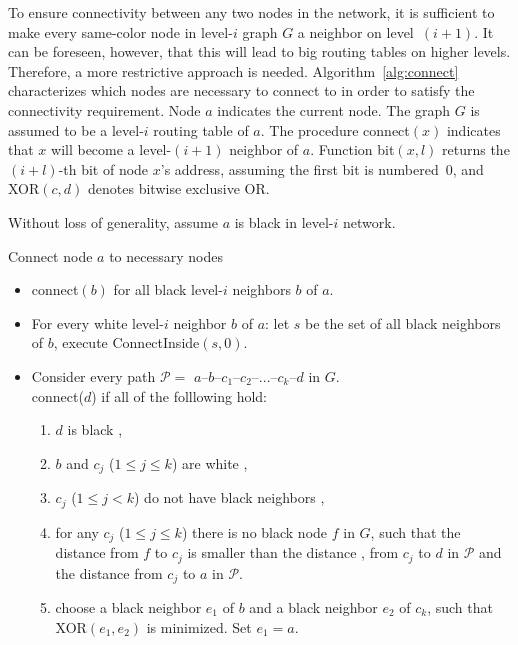 \documentclass[conference]{IEEEtran}
\theoremstyle{definition}
\newcommand{\cP}{{\mathcal{P}}}
\newcommand{\cN}{{\mathcal{N}}}
\begin{document}
To ensure connectivity between any two nodes in the network, it is sufficient to make every same-color node in level-$i$ graph $G$ a neighbor on level~$(i+1)$. It can be foreseen, however, that this will lead to big routing tables on higher levels. Therefore, a more restrictive approach is needed. Algorithm~\ref{alg:connect} characterizes which nodes are necessary to connect to in order to satisfy the connectivity requirement. Node $a$ indicates the current node. The graph $G$ is assumed to be a level-$i$ routing table of $a$.
The procedure  connect$(x)$ indicates that $x$ will become a level-$(i+1)$ neighbor of $a$. Function bit$(x, l)$ returns the $(i + l)$-th bit of node $x$'s address, assuming the first bit is numbered~0, and XOR$(c, d)$ denotes bitwise exclusive OR.

Without loss of generality, assume $a$ is black in level-$i$ network.



\begin{algorithm}[H]
    \caption{Connect node $a$ to necessary nodes}
    \label{alg:connect}

    \begin{itemize} 
        \item   connect$(b)$ for all black level-$i$ neighbors $b$ of $a$.

        \item   For every white level-$i$ neighbor $b$ of $a$: 
                let $s$ be the set of all black neighbors of $b$, execute ConnectInside$(s, 0)$.

        \item   Consider every path $\cP = $ $a$--$b$--$c_1$--$c_2$--...--$c_k$--$d$ in $G$.  \\
        connect($d$) if all of the folllowing hold:
        \begin{enumerate}
            \item   $d$ is black ,
            \item   $b$ and $c_j$ ($1 \le j \le k$) are white ,
            \item   $c_j$ ($1 \le j < k$) do not have black neighbors ,
            \item   for any $c_j$ ($1 \le j \le k$) there is no black node $f$ in $G$, such that the distance
                    from $f$ to $c_j$ is smaller than the distance ,
                    from $c_j$ to $d$ in $\cP$ and the distance from $c_j$ to $a$ in $\cP$.
            \item   choose a black neighbor $e_1$ of $b$ and a black neighbor $e_2$ of $c_k$,
                    such that XOR$(e_1, e_2)$ is minimized. Set $e_1 = a$.
        \end{enumerate}
    \end{itemize} 
\end{algorithm}
\end{document}
